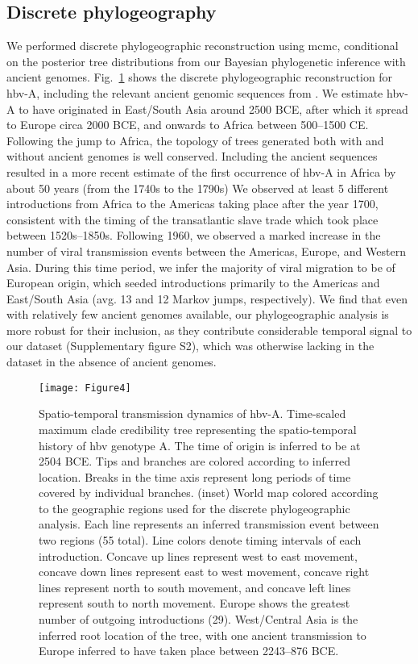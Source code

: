 \subsection{Discrete phylogeography}
We performed discrete phylogeographic reconstruction using \gls{mcmc}, conditional on the posterior tree distributions from our Bayesian phylogenetic inference with ancient genomes.
Fig.~\ref{fig:3-4} shows the discrete phylogeographic reconstruction for \gls{hbv}-A, including the relevant ancient genomic sequences from \citet{muhlemann2018ancient}.
We estimate \gls{hbv}-A to have originated in East/South Asia around 2500 BCE, after which it spread to Europe circa 2000 BCE, and onwards to Africa between 500--1500 CE.
Following the jump to Africa, the topology of trees generated both with and without ancient genomes is well conserved.
Including the ancient sequences resulted in a more recent estimate of the first occurrence of \gls{hbv}-A in Africa by about 50 years (from the 1740s to the 1790s)
We observed at least 5 different introductions from Africa to the Americas taking place after the year 1700, consistent with the timing of the transatlantic slave trade which took place between 1520s--1850s.
Following 1960, we observed a marked increase in the number of viral transmission events between the Americas, Europe, and Western Asia.
During this time period, we infer the majority of viral migration to be of European origin, which seeded introductions primarily to the Americas and East/South Asia (avg. 13 and 12 Markov jumps, respectively).
We find that even with relatively few ancient genomes available, our phylogeographic analysis is more robust for their inclusion, as they contribute considerable temporal signal to our dataset (Supplementary figure S2), which was otherwise lacking in the dataset in the absence of ancient genomes.

\begin{figure}[ht]
  \centering
  \texttt{[image: Figure4]}
  \caption[HBV-A phylogeography]{Spatio-temporal transmission dynamics of \gls{hbv}-A. Time-scaled maximum clade credibility tree representing the spatio-temporal history of \gls{hbv} genotype A. The time of origin is inferred to be at 2504 BCE. Tips and branches are colored according to inferred location. Breaks in the time axis represent long periods of time covered by individual branches. (inset) World map colored according to the geographic regions used for the discrete phylogeographic analysis. Each line represents an inferred transmission event between two regions (55 total). Line colors denote timing intervals of each introduction. Concave up lines represent west to east movement, concave down lines represent east to west movement, concave right lines represent north to south movement, and concave left lines represent south to north movement. Europe shows the greatest number of outgoing introductions (29). West/Central Asia is the inferred root location of the tree, with one ancient transmission to Europe inferred to have taken place between 2243--876 BCE.}
  \label{fig:3-4}
\end{figure}

